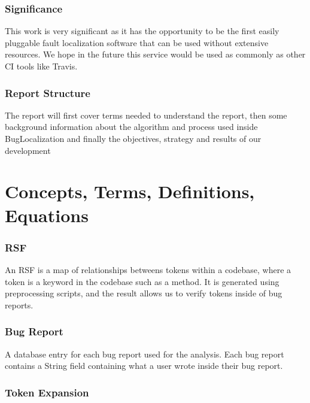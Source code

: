 \documentclass[12pt]{article}
\begin{document}
\hypertarget{significance}{%
\subsubsection{Significance}\label{significance}}

This work is very significant as it has the opportunity to be the first
easily pluggable fault localization software that can be used without
extensive resources. We hope in the future this service would be used as
commonly as other CI tools like Travis.

\hypertarget{report-structure}{%
\subsubsection{Report Structure}\label{report-structure}}

The report will first cover terms needed to understand the report, then
some background information about the algorithm and process used inside
BugLocalization and finally the objectives, strategy and results of our
development

\hypertarget{concepts-terms-definitions-equations}{%
\section{Concepts, Terms, Definitions,
Equations}\label{concepts-terms-definitions-equations}}

\hypertarget{rsf}{%
\subsubsection{RSF}\label{rsf}}

An RSF is a map of relationships betweens tokens within a codebase,
where a token is a keyword in the codebase such as a method. It is
generated using preprocessing scripts, and the result allows us to
verify tokens inside of bug reports.

\hypertarget{bug-report}{%
\subsubsection{Bug Report}\label{bug-report}}

A database entry for each bug report used for the analysis. Each bug
report contains a String field containing what a user wrote inside their
bug report.

\hypertarget{token-expansion}{%
\subsubsection{Token Expansion}\label{token-expansion}}
\end{document}
